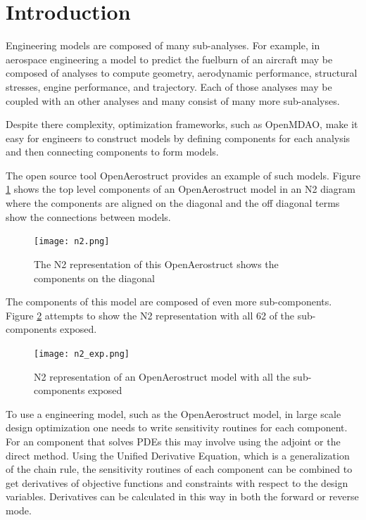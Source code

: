 \documentclass[conf]{new-aiaa}
\begin{document}
\section{Introduction}


Engineering models are composed of many sub-analyses.
For example, in aerospace engineering a model to predict the fuelburn of an aircraft may be composed of analyses to compute geometry, aerodynamic performance, structural stresses, engine performance, and trajectory.
Each of those analyses may be coupled with an other analyses and many consist of many more sub-analyses.

Despite there complexity, optimization frameworks, such as OpenMDAO\cite{Gray2019a}, make it easy for engineers to construct models by defining components for each analysis and then connecting components to form models.

The open source tool OpenAerostruct\cite{Jasa2018a} provides an example of such models.
Figure \ref{fig:n2} shows the top level components of an OpenAerostruct model in an N2 diagram where the components are aligned on the diagonal and the off diagonal terms show the connections between models.


\begin{figure}[H]
	\centering
	\texttt{[image: n2.png]}
	\caption{The N2 representation of this OpenAerostruct shows the components on the diagonal}
	\label{fig:n2}
\end{figure}

The components of this model are composed of even more sub-components.
Figure \ref{fig:n2_exp} attempts to show the N2 representation with all 62 of the sub-components exposed.

\begin{figure}[H]
    \centering
    \texttt{[image: n2\_exp.png]}
	\caption{N2 representation of an OpenAerostruct model with all the sub-components exposed}
	\label{fig:n2_exp}
\end{figure}


To use a engineering model, such as the OpenAerostruct model, in large scale design optimization one needs to write sensitivity routines for each component.
For an component that solves PDEs this may involve using the adjoint or the direct method.
Using the Unified Derivative Equation\cite{Martins2013a}, which is a generalization of the chain rule, the sensitivity routines of each component can be combined to get derivatives of objective functions and constraints with respect to the design variables.
Derivatives can be calculated in this way in both the forward or reverse mode.
\end{document}
